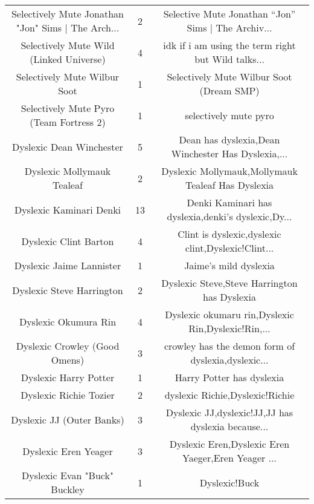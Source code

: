 \begin{table}[h!]
{\begin{tabular}{|c|c|c|}
Selectively Mute Jonathan "Jon" Sims | The Arch... &      2 & Selective Mute Jonathan “Jon” Sims | The Archiv... \\
           Selectively Mute Wild (Linked Universe) &      4 & idk if i am using the term right but Wild talks... \\
                      Selectively Mute Wilbur Soot &      1 &           Selectively Mute Wilbur Soot (Dream SMP) \\
           Selectively Mute Pyro (Team Fortress 2) &      1 &                              selectively mute pyro \\
                          Dyslexic Dean Winchester &      5 & Dean has dyslexia,Dean Winchester Has Dyslexia,... \\
                        Dyslexic Mollymauk Tealeaf &      2 &  Dyslexic Mollymauk,Mollymauk Tealeaf Has Dyslexia \\
                           Dyslexic Kaminari Denki &     13 & Denki Kaminari has dyslexia,denki's dyslexic,Dy... \\
                             Dyslexic Clint Barton &      4 & Clint is dyslexic,dyslexic clint,Dyslexic!Clint... \\
                          Dyslexic Jaime Lannister &      1 &                              Jaime's mild dyslexia \\
                         Dyslexic Steve Harrington &      2 &       Dyslexic Steve,Steve Harrington has Dyslexia \\
                              Dyslexic Okumura Rin &      4 & Dyslexic okumaru rin,Dyslexic Rin,Dyslexic!Rin,... \\
                     Dyslexic Crowley (Good Omens) &      3 & crowley has the demon form of dyslexia,dyslexic... \\
                             Dyslexic Harry Potter &      1 &                          Harry Potter has dyslexia \\
                            Dyslexic Richie Tozier &      2 &                    dyslexic Richie,Dyslexic!Richie \\
                         Dyslexic JJ (Outer Banks) &      3 & Dyslexic JJ,dyslexic!JJ,JJ has dyslexia because... \\
                              Dyslexic Eren Yeager &      3 & Dyslexic Eren,Dyslexic Eren Yaeger,Eren Yeager ... \\
                      Dyslexic Evan "Buck" Buckley &      1 &                                      Dyslexic!Buck \\

\end{tabular}}
\end{table}
